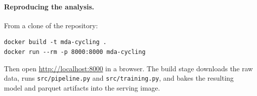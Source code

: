 \documentclass[11pt,a4paper]{article}
\begin{document}
\paragraph{Reproducing the analysis.}
From a clone of the repository:

\begin{verbatim}
docker build -t mda-cycling .
docker run --rm -p 8000:8000 mda-cycling
\end{verbatim}

\noindent Then open \url{http://localhost:8000} in a browser. The
build stage downloads the raw data, runs \texttt{src/pipeline.py} and
\texttt{src/training.py}, and bakes the resulting model and parquet
artifacts into the serving image.
\end{document}

